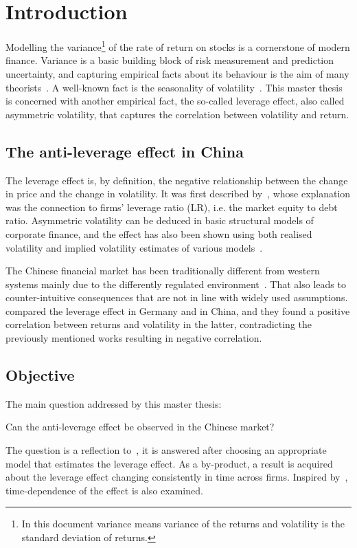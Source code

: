 \section{Introduction}

Modelling the variance\footnote{In this document variance means variance of the returns and volatility is the standard deviation of returns.} of the rate of return on stocks is a cornerstone of modern finance.
Variance is a basic building block of risk measurement and prediction uncertainty, and capturing empirical facts about its behaviour is the aim of many theorists~\citep{Christie1982}.
A well-known fact is the seasonality of volatility~\citep{schwert1989why}.
This master thesis is concerned with another empirical fact, the so-called leverage effect, also called asymmetric volatility, that captures the correlation between volatility and return.

\subsection{The anti-leverage effect in China}

The leverage effect is, by definition, the negative relationship between the change in price and the change in volatility.
It was first described by~\citet{black1976studies}, whose explanation was the connection to firms' leverage ratio (LR), i.e. the market equity to debt ratio.
Asymmetric volatility can be deduced in basic structural models of corporate finance, and the effect has also been shown using both realised volatility and implied volatility estimates of various models~\citep{Christie1982,french1987expected,Harvey1996,Bouchaud2001}.

The Chinese financial market has been traditionally different from western systems mainly due to the differently regulated environment~\citep{GORDON2003}.
That also leads to counter-intuitive consequences that are not in line with widely used assumptions.
\citet{Shen2009} compared the leverage effect in Germany and in China, and they found a positive correlation between returns and volatility in the latter, contradicting the previously mentioned works resulting in negative correlation.


\subsection{Objective}

The main question addressed by this master thesis:
\begin{center}
	Can the anti-leverage effect be observed in the Chinese market?
\end{center}
The question is a reflection to~\citet{Shen2009}, it is answered after choosing an appropriate model that estimates the leverage effect.
As a by-product, a result is acquired about the leverage effect changing consistently in time across firms.
Inspired by~\citet{Christensen2015}, time-dependence of the effect is also examined.
